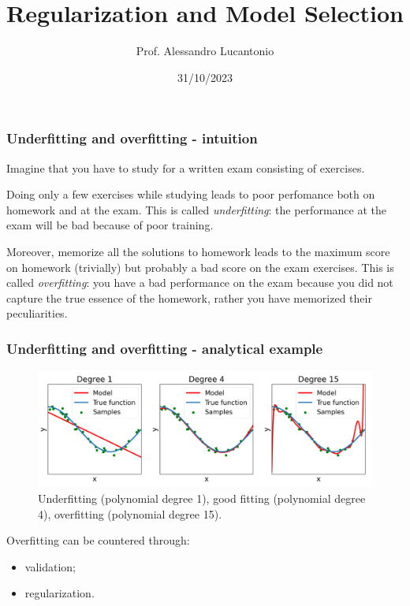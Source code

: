 \documentclass{beamer}
\title{Regularization and Model Selection}
\author{Prof. Alessandro Lucantonio}
\institute{Aarhus University}
\date{31/10/2023}
\begin{document}
	\frame{\titlepage}
	
		\begin{frame}
		\frametitle{Underfitting and overfitting - intuition}
		
		Imagine that you have to study for a written exam consisting of exercises. 
		
		\vspace{5mm}
		
		Doing only a few exercises while studying leads to poor perfomance both on homework and at the exam. This is called \textsl{underfitting}: the performance at the exam will be bad because of poor training.
		
		\vspace{5mm}
		
		Moreover, memorize all the solutions to homework leads to the maximum score on homework (trivially) but probably a bad score on the exam exercises. This is called \textsl{overfitting}: you have a bad performance on the exam because you did not capture the true essence of the homework, rather you have memorized their peculiarities.
	\end{frame}
	
	\begin{frame}
		\frametitle{Underfitting and overfitting - analytical example}
		\begin{figure}
			\centering
			\includegraphics[scale=0.35]{images/overfitting_poly}
			\caption{Underfitting (polynomial degree 1), good fitting (polynomial degree 4), overfitting (polynomial degree 15).}
		\end{figure}
		
		Overfitting can be countered through:
		\begin{itemize}
			\item validation;
			\item regularization.
		\end{itemize}
	\end{frame}
	
\end{document}

